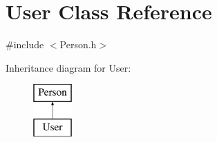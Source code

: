 \hypertarget{class_user}{}\section{User Class Reference}
\label{class_user}


{\ttfamily \#include $<$Person.\+h$>$}

Inheritance diagram for User\+:\begin{figure}[H]
\begin{center}
\leavevmode
\includegraphics[height=2.000000cm]{class_user}
\end{center}
\end{figure}

